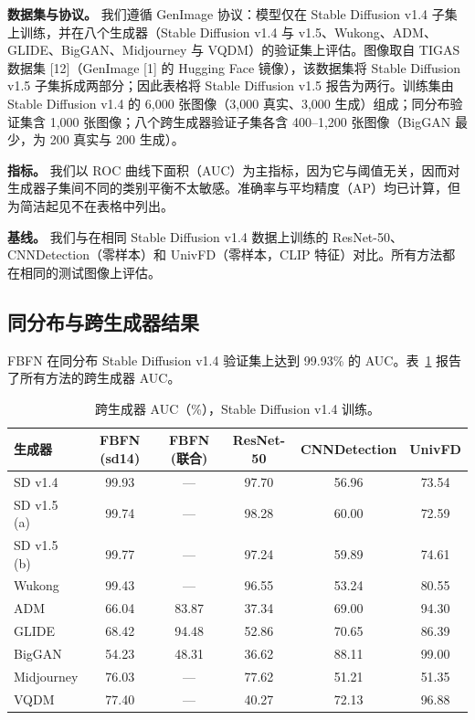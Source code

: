 \documentclass[11pt]{ctexart}
\begin{document}
\textbf{数据集与协议。} 我们遵循 GenImage 协议：模型仅在 Stable Diffusion v1.4 子集上训练，并在八个生成器（Stable Diffusion v1.4 与 v1.5、Wukong、ADM、GLIDE、BigGAN、Midjourney 与 VQDM）的验证集上评估。图像取自 TIGAS 数据集 [12]（GenImage [1] 的 Hugging Face 镜像），该数据集将 Stable Diffusion v1.5 子集拆成两部分；因此表格将 Stable Diffusion v1.5 报告为两行。训练集由 Stable Diffusion v1.4 的 6,000 张图像（3,000 真实、3,000 生成）组成；同分布验证集含 1,000 张图像；八个跨生成器验证子集各含 400--1,200 张图像（BigGAN 最少，为 200 真实与 200 生成）。

\textbf{指标。} 我们以 ROC 曲线下面积（AUC）为主指标，因为它与阈值无关，因而对生成器子集间不同的类别平衡不太敏感。准确率与平均精度（AP）均已计算，但为简洁起见不在表格中列出。

\textbf{基线。} 我们与在相同 Stable Diffusion v1.4 数据上训练的 ResNet-50、CNNDetection（零样本）和 UnivFD（零样本，CLIP 特征）对比。所有方法都在相同的测试图像上评估。

\subsection{同分布与跨生成器结果}

FBFN 在同分布 Stable Diffusion v1.4 验证集上达到 99.93\% 的 AUC。表~\ref{tab:1} 报告了所有方法的跨生成器 AUC。

\begin{table}[h]
\centering
\caption{跨生成器 AUC（\%），Stable Diffusion v1.4 训练。}
\label{tab:1}
\begin{tabular}{lccccc}
\toprule
生成器 & FBFN (sd14) & FBFN (联合) & ResNet-50 & CNNDetection & UnivFD \\
\midrule
SD v1.4 & 99.93 & --- & 97.70 & 56.96 & 73.54 \\
SD v1.5 (a) & 99.74 & --- & 98.28 & 60.00 & 72.59 \\
SD v1.5 (b) & 99.77 & --- & 97.24 & 59.89 & 74.61 \\
Wukong & 99.43 & --- & 96.55 & 53.24 & 80.55 \\
ADM & 66.04 & 83.87 & 37.34 & 69.00 & 94.30 \\
GLIDE & 68.42 & 94.48 & 52.86 & 70.65 & 86.39 \\
BigGAN & 54.23 & 48.31 & 36.62 & 88.11 & 99.00 \\
Midjourney & 76.03 & --- & 77.62 & 51.21 & 51.35 \\
VQDM & 77.40 & --- & 40.27 & 72.13 & 96.88 \\
\bottomrule
\end{tabular}
\end{table}
\end{document}
